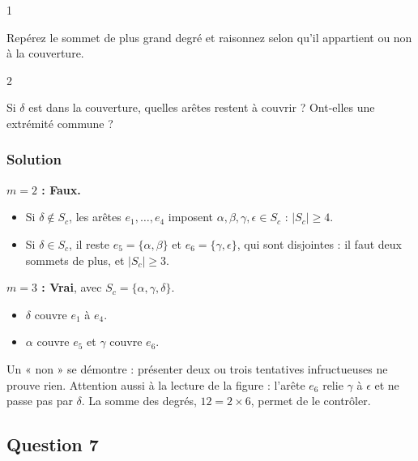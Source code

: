 \documentclass[11pt,a4paper]{article}
\providecommand{\tightlist}{\setlength{\itemsep}{0pt}\setlength{\parskip}{0pt}}
\begin{document}
\begin{indication}{1}

Repérez le sommet de plus grand degré et raisonnez selon qu'il appartient ou non à la couverture.

\end{indication}

\begin{indication}{2}

Si \(\delta\) est dans la couverture, quelles arêtes restent à couvrir ? Ont-elles une extrémité commune ?

\end{indication}

\hypertarget{solution-5}{%
\subsubsection{Solution}\label{solution-5}}

\textbf{\(m=2\) : Faux.}

\begin{itemize}
\tightlist
\item
  Si \(\delta\notin S_c\), les arêtes \(e_1,\dots,e_4\) imposent \(\alpha,\beta,\gamma,\epsilon\in S_c\) : \(|S_c|\ge 4\).
\item
  Si \(\delta\in S_c\), il reste \(e_5=\{\alpha,\beta\}\) et \(e_6=\{\gamma,\epsilon\}\), qui sont disjointes : il faut deux sommets de plus, et \(|S_c|\ge 3\).
\end{itemize}

\textbf{\(m=3\) : Vrai}, avec \(S_c=\{\alpha,\gamma,\delta\}\).

\begin{itemize}
\tightlist
\item
  \(\delta\) couvre \(e_1\) à \(e_4\).
\item
  \(\alpha\) couvre \(e_5\) et \(\gamma\) couvre \(e_6\).
\end{itemize}

\begin{piege}

Un « non » se démontre : présenter deux ou trois tentatives infructueuses ne prouve rien. Attention aussi à la lecture de la figure : l'arête \(e_6\) relie \(\gamma\) à \(\epsilon\) et ne passe pas par \(\delta\). La somme des degrés, \(12=2\times 6\), permet de le contrôler.

\end{piege}

\hypertarget{question-7}{%
\subsection{Question 7}\label{question-7}}
\end{document}
